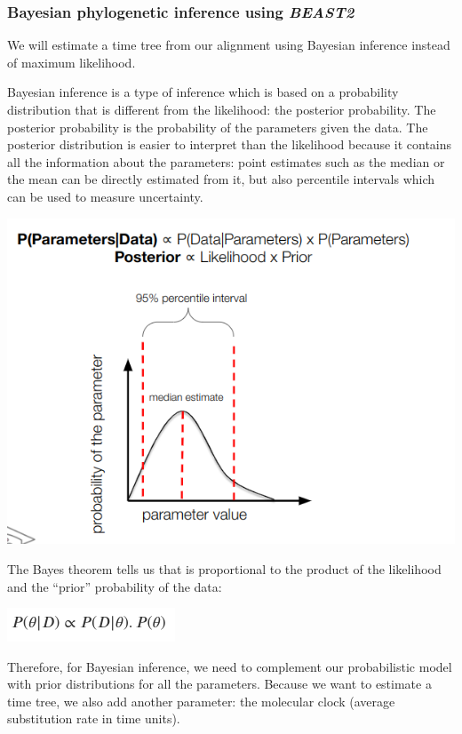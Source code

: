 \documentclass[
  letterpaper,
]{book}
\begin{document}
\hypertarget{bayesian-phylogenetic-inference-using-beast2}{%
\subsubsection{\texorpdfstring{Bayesian phylogenetic inference using
\emph{BEAST2}}{Bayesian phylogenetic inference using BEAST2}}\label{bayesian-phylogenetic-inference-using-beast2}}

We will estimate a time tree from our alignment using Bayesian inference
instead of maximum likelihood.

Bayesian inference is a type of inference which is based on a
probability distribution that is different from the likelihood: the
posterior probability. The posterior probability is the probability of
the parameters given the data. The posterior distribution is easier to
interpret than the likelihood because it contains all the information
about the parameters: point estimates such as the median or the mean can
be directly estimated from it, but also percentile intervals which can
be used to measure uncertainty.

\includegraphics{assets/images/chapters/phylogenomics/23.png}

The Bayes theorem tells us that is proportional to the product of the
likelihood and the ``prior'' probability of the data:

\includegraphics{assets/images/chapters/phylogenomics/equation.png}

Therefore, for Bayesian inference, we need to complement our
probabilistic model with prior distributions for all the parameters.
Because we want to estimate a time tree, we also add another parameter:
the molecular clock (average substitution rate in time units).
\end{document}
